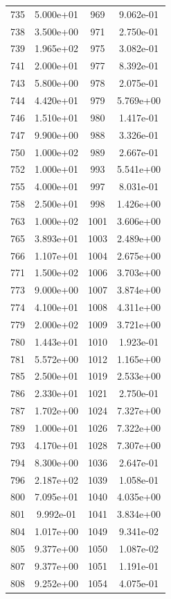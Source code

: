 \documentclass[12pt]{article}
\begin{document}
\begin{longtable}{@{}cccc@{}}
735 & 5.000e+01 & 969 & 9.062e-01 \\
738 & 3.500e+00 & 971 & 2.750e-01 \\
739 & 1.965e+02 & 975 & 3.082e-01 \\
741 & 2.000e+01 & 977 & 8.392e-01 \\
743 & 5.800e+00 & 978 & 2.075e-01 \\
744 & 4.420e+01 & 979 & 5.769e+00 \\
746 & 1.510e+01 & 980 & 1.417e-01 \\
747 & 9.900e+00 & 988 & 3.326e-01 \\
750 & 1.000e+02 & 989 & 2.667e-01 \\
752 & 1.000e+01 & 993 & 5.541e+00 \\
755 & 4.000e+01 & 997 & 8.031e-01 \\
758 & 2.500e+01 & 998 & 1.426e+00 \\
763 & 1.000e+02 & 1001 & 3.606e+00 \\
765 & 3.893e+01 & 1003 & 2.489e+00 \\
766 & 1.107e+01 & 1004 & 2.675e+00 \\
771 & 1.500e+02 & 1006 & 3.703e+00 \\
773 & 9.000e+00 & 1007 & 3.874e+00 \\
774 & 4.100e+01 & 1008 & 4.311e+00 \\
779 & 2.000e+02 & 1009 & 3.721e+00 \\
780 & 1.443e+01 & 1010 & 1.923e-01 \\
781 & 5.572e+00 & 1012 & 1.165e+00 \\
785 & 2.500e+01 & 1019 & 2.533e+00 \\
786 & 2.330e+01 & 1021 & 2.750e-01 \\
787 & 1.702e+00 & 1024 & 7.327e+00 \\
789 & 1.000e+01 & 1026 & 7.322e+00 \\
793 & 4.170e+01 & 1028 & 7.307e+00 \\
794 & 8.300e+00 & 1036 & 2.647e-01 \\
796 & 2.187e+02 & 1039 & 1.058e-01 \\
800 & 7.095e+01 & 1040 & 4.035e+00 \\
801 & 9.992e-01 & 1041 & 3.834e+00 \\
804 & 1.017e+00 & 1049 & 9.341e-02 \\
805 & 9.377e+00 & 1050 & 1.087e-02 \\
807 & 9.377e+00 & 1051 & 1.191e-01 \\
808 & 9.252e+00 & 1054 & 4.075e-01 \\

\end{longtable}
\end{document}
